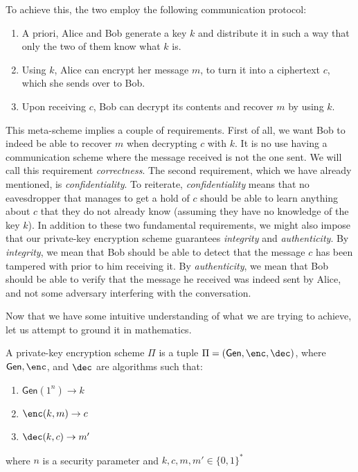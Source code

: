 \documentclass[12pt]{tufte-book}
\newcommand{\gen}{\mathsf{Gen}}
\begin{document}
To achieve this, the two employ the following communication protocol:
\begin{enumerate}
    \item A priori, Alice and Bob generate a key $k$ and distribute it in such a way that only the two of them know what $k$ is.
    \item Using $k$, Alice can encrypt her message $m$, to turn it into a ciphertext $c$, which she sends over to Bob. 
    \item Upon receiving $c$, Bob can decrypt its contents and recover $m$ by using $k$.
\end{enumerate}
This meta-scheme implies a couple of requirements.
First of all, we want Bob to indeed be able to recover $m$ when decrypting $c$ with $k$.
It is no use having a communication scheme where the message received is not the one sent. We will call this requirement \textit{correctness}.
The second requirement, which we have already mentioned, is \textit{confidentiality}.
To reiterate, \textit{confidentiality} means that no eavesdropper that manages to get a hold of $c$ should be able to learn anything about $c$ that they do not already know (assuming they have no knowledge of the key $k$).
In addition to these two fundamental requirements, we might also impose that our private-key encryption scheme guarantees \textit{integrity} and \textit{authenticity}.
By \textit{integrity}, we mean that Bob should be able to detect that the message $c$ has been tampered with prior to him receiving it.
By \textit{authenticity}, we mean that Bob should be able to verify that the message he received was indeed sent by Alice, and not some adversary interfering with the conversation.

Now that we have some intuitive understanding of what we are trying to achieve, let us attempt to ground it in mathematics.

\begin{definition}
    A private-key encryption scheme $\Pi$ is a tuple $\Pi = (\gen, \enc, \dec)$, where $\gen, \enc$, and $\dec$ are algorithms such that:
    \begin{enumerate}
        \item $\gen(1^n) \rightarrow k$
        \item $\enc(k, m) \rightarrow c$
        \item $\dec(k, c) \rightarrow m'$
    \end{enumerate}

    where $n$ is a security parameter and $k, c, m, m' \in \{0, 1\}^*$
\end{definition}
\end{document}
